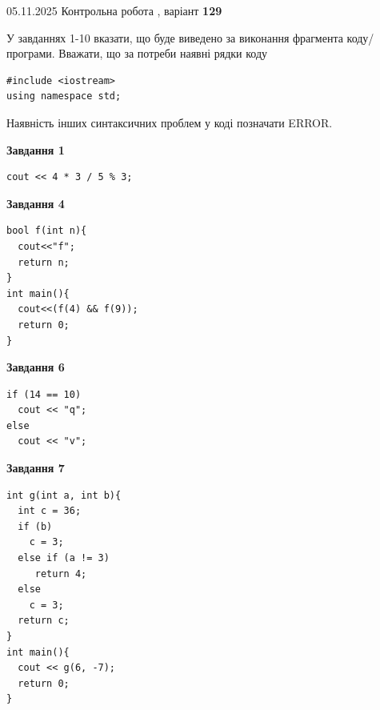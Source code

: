 \documentclass[12pt, ukrainian]{article}
\begin{document}
\newpage

{\Large{05.11.2025 Контрольна робота , варіант  \No \textbf { 129 }\par}}
{
\begin {large}
У завданнях 1-10 вказати, що буде виведено за виконання фрагмента коду/про\-гра\-ми.
Вважати, що за потреби наявні рядки коду
\begin{verbatim}
#include <iostream>
using namespace std;
\end{verbatim}
Наявність інших синтаксичних проблем у коді позначати ERROR.

\begin{minipage}[t]{7.0cm}

\begin{center}
\textbf{Завдання 1}
\end{center}
\vspace{-8mm}

\begin{verbatim}
cout << 4 * 3 / 5 % 3;
\end{verbatim}



\begin{center}
\textbf{Завдання 4}
\end{center}
\vspace{-8mm}

\begin{verbatim}
bool f(int n){
  cout<<"f";
  return n;
}
int main(){
  cout<<(f(4) && f(9));
  return 0;
}
\end{verbatim}



\begin{center}
\textbf{Завдання 6}
\end{center}
\vspace{-8mm}

\begin{verbatim}
if (14 == 10)
  cout << "q";
else
  cout << "v";
\end{verbatim}



\begin{center}
\textbf{Завдання 7}
\end{center}
\vspace{-8mm}

\begin{verbatim}
int g(int a, int b){
  int c = 36;
  if (b)
    c = 3;
  else if (a != 3)
     return 4;
  else
    c = 3;
  return c;
}
int main(){
  cout << g(6, -7);
  return 0;
}
\end{verbatim}


\end{minipage}
\end{large}}
\end{document}
